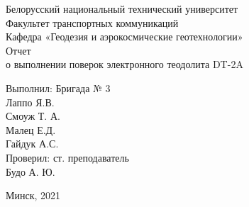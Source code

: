 \documentclass[a4paper]{article}
\begin{document}
\begin{titlepage}
\begin{center}
\large{Белорусский национальный технический университет}\\
\large{Факультет транспортных коммуникаций}\\
\large{Кафедра «Геодезия и аэрокосмические геотехнологии»}\\
\hfill \break
\hfill \break
\hfill \break
\hfill \break
\hfill \break
\hfill \break
\large{Отчет\\
 о выполнении поверок электронного теодолита DT-2A }\\
\hfill \break
\hfill \break
\hfill \break
\hfill \break

\end{center}
\begin{flushright}
  \large{Выполнил: Бригада № 3\\
	Лаппо Я.В.\\
	Смоуж Т. А.\\
	Малец Е.Д.\\
	Гайдук А.С.\\
	\hfill \break
	Проверил: ст. преподаватель\\
	Будо А. Ю.\\}
\end{flushright}
\begin{center}
\hfill \break
\hfill \break
\hfill \break
\large{Минск, 2021\\}
\end{center}
\end{titlepage}
\end{document}
